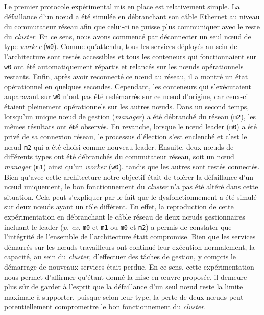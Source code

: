 Le premier protocole expérimental mis en place est relativement simple. La défaillance d'un n\oe{}ud a été simulée en débranchant son câble Ethernet au niveau du commutateur réseau afin que celui-ci ne puisse plus communiquer avec le reste du \textit{cluster}. En ce sens, nous avons commencé par déconnecter un seul n\oe{}ud de type \textit{worker} (\texttt{w0}). Comme qu'attendu, tous les services déployés au sein de l'architecture sont restés accessibles et tous les conteneurs qui fonctionnaient sur \texttt{w0} ont été automatiquement répartis et relancés sur les n\oe{}uds opérationnels restants. Enfin, après avoir reconnecté ce n\oe{}ud au réseau, il a montré un état opérationnel en quelques secondes. Cependant, les conteneurs qui s'exécutaient auparavant sur \texttt{w0} n'ont pas été redémarrés sur ce n\oe{}ud d'origine, car ceux-ci étaient pleinement opérationnels sur les autres n\oe{}uds. Dans un second temps, lorsqu'un unique n\oe{}ud de gestion (\textit{manager}) a été débranché du réseau (\texttt{m2}), les mêmes résultats ont été observés. En revanche, lorsque le n\oe{}ud leader (\texttt{m0}) a été privé de sa connexion réseau, le processus d'élection s'est enclenché et c'est le n\oe{}ud \texttt{m2} qui a été choisi comme nouveau leader. Ensuite, deux n\oe{}uds de différents types ont été débranchés du commutateur réseau, soit un n\oe{}ud \textit{manager} (\texttt{m1}) ainsi qu'un \textit{worker} (\texttt{w0}), tandis que les autres sont restés connectés. Bien qu'avec cette architecture notre objectif était de tolérer la défaillance d'un n\oe{}ud uniquement, le bon fonctionnement du \textit{cluster} n'a pas été altéré dans cette situation. Cela peut s'expliquer par le fait que le dysfonctionnement a été simulé sur deux n\oe{}uds ayant un rôle différent. En effet, la reproduction de cette expérimentation en débranchant le câble réseau de deux n\oe{}uds gestionnaires incluant le leader (\textit{p. ex.} \texttt{m0} et \texttt{m1} ou \texttt{m0} et \texttt{m2}) a permis de constater que l'intégrité de l'ensemble de l'architecture était compromise. Bien que les services démarrés sur les n\oe{}uds travailleurs ont continué leur exécution normalement, la capacité, au sein du \textit{cluster}, d'effectuer des tâches de gestion, y compris le démarrage de nouveaux services était perdue. En ce sens, cette expérimentation nous permet d'affirmer qu'étant donné la mise en \oe{}uvre proposée, il demeure plus sûr de garder à l'esprit que la défaillance d'un seul n\oe{}ud reste la limite maximale à supporter, puisque selon leur type, la perte de deux n\oe{}uds peut potentiellement compromettre le bon fonctionnement du \textit{cluster}.

